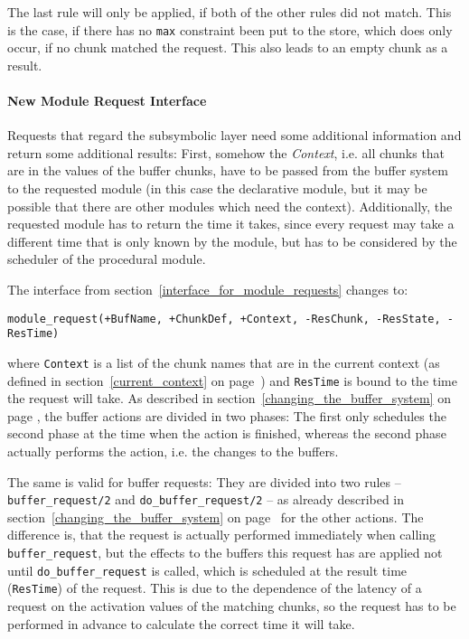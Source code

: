 The last rule will only be applied, if both of the other rules did not match. This is the case, if there has no \verb|max| constraint been put to the store, which does only occur, if no chunk matched the request. This also leads to an empty chunk as a result.

\paragraph{New Module Request Interface}

Requests that regard the subsymbolic layer need some additional information and return some additional results: First, somehow the \emph{Context}, i.e. all chunks that are in the values of the buffer chunks, have to be passed from the buffer system to the requested module (in this case the declarative module, but it may be possible that there are other modules which need the context). Additionally, the requested module has to return the time it takes, since every request may take a different time that is only known by the module, but has to be considered by the scheduler of the procedural module.

The interface from section~\ref{interface_for_module_requests} changes to:

\begin{lstlisting}
module_request(+BufName, +ChunkDef, +Context, -ResChunk, -ResState, -ResTime) 
\end{lstlisting}

where \verb|Context| is a list of the chunk names that are in the current context (as defined in section~\ref{current_context} on page~\pageref{current_context}) and \verb|ResTime| is bound to the time the request will take. As described in section~\ref{changing_the_buffer_system} on page \pageref{changing_the_buffer_system}, the buffer actions are divided in two phases: The first only schedules the second phase at the time when the action is finished, whereas the second phase actually performs the action, i.e. the changes to the buffers.

The same is valid for buffer requests: They are divided into two rules -- \verb|buffer_request/2| and \verb|do_buffer_request/2| -- as already described in section~\ref{changing_the_buffer_system} on page~\pageref{changing_the_buffer_system} for the other actions. The difference is, that the request is actually performed immediately when calling \verb|buffer_request|, but the effects to the buffers this request has are applied not until \verb|do_buffer_request| is called, which is scheduled at the result time (\verb|ResTime|) of the request. This is due to the dependence of the latency of a request on the activation values of the matching chunks, so the request has to be performed in advance to calculate the correct time it will take.

